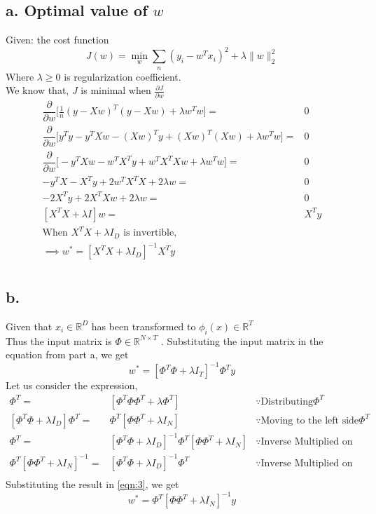 \documentclass[letterpaper,doc,notimes]{apa6}
\begin{document}
\subsection{a. Optimal value of $w$}
Given: the cost function 
$$
	J(w) = \min_w \sum_n (y_i - w^Tx_i)^2 + \lambda \parallel w \parallel^2_2
$$
Where $\lambda \ge 0$ is regularization coefficient.\\
We know that, $J$ is minimal when $\frac{\partial J}{\partial w}$
 \begin{align*}
 \dfrac{\partial}{\partial w} \bigg[ \frac{1}{n} (y - Xw)^T (y - Xw) + \lambda  w^T w \bigg] = & 0 \\
 \dfrac{\partial}{\partial w} \bigg[ y^Ty - y^T Xw - (Xw)^Ty + (Xw)^T(Xw) +  \lambda  w^T w \bigg] = & 0 \\
 \dfrac{\partial}{\partial w} \bigg[ - y^T Xw - w^TX^Ty + w^TX^TXw +  \lambda  w^T w \bigg] = & 0 \\
 - y^T X -  X^Ty + 2w^TX^TX +  2\lambda w  = & 0 \\
 - 2 X^Ty  + 2X^TXw +  2\lambda w  = & 0 \\
 [ X^TX +  \lambda I ] w  = &  X^T y  \\
 \text{When $X^TX +  \lambda I_D$ is invertible, } & \\
 \implies w^* =  [ X^TX +  \lambda I_D ]^{-1} X^T y  & \\
 \end{align*}

\subsection{b. }
Given that $x_i \in \mathbb{R}^D$  has been transformed to $\phi_i(x) \in \mathbb{R}^T$ \\
Thus the input matrix is  $\Phi \in \mathbb{R}^{N\times T}$ .
Substituting the input matrix in the equation from part a, we get \\
\begin{equation}\label{eqn:3}
	w^* =  [ \Phi^T\Phi +  \lambda I_T ]^{-1} \Phi^T y 
\end{equation}
Let us consider the expression,
\begin{align*}
[ \Phi^T\Phi +  \lambda I_D ] \Phi^T  =& [ \Phi^T\Phi\Phi^T +  \lambda \Phi^T ] &  \because \text{Distributing} \Phi^T\\ 
[ \Phi^T\Phi +  \lambda I_D ] \Phi^T  =& \Phi^T[ \Phi\Phi^T +  \lambda I_N ]  &  \because \text{Moving to the left side} \Phi^T \\ 
 \Phi^T  =& [ \Phi^T\Phi +  \lambda I_D ]^{-1} \Phi^T[ \Phi\Phi^T +  \lambda I_N ]  & \because \text{Inverse Multiplied on left }\\ 
 \Phi^T[ \Phi\Phi^T +  \lambda I_N ]^{-1} =& [ \Phi^T\Phi +  \lambda I_D ]^{-1} \Phi^T   & \because \text{Inverse Multiplied on Right }\\ 
\end{align*}
Substituting the result in \ref{eqn:3}, we get \\
\begin{equation}\label{eqn:4}
w^* = \Phi^T[ \Phi\Phi^T +  \lambda I_N ]^{-1} y
\end{equation}
\end{document}
